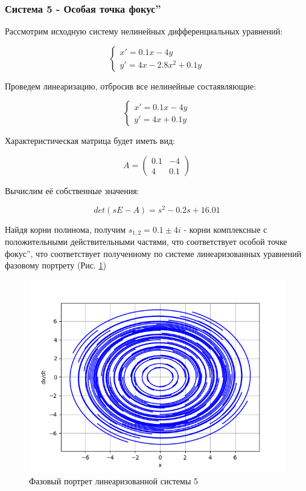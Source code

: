 \subsubsection{Система 5 - Особая точка  фокус\textquotedblright}

Рассмотрим исходную систему нелинейных дифференциальных уравнений:

$$
\begin{cases}
x' = 0.1x - 4y \\
y' = 4x - 2.8x^2 + 0.1y
\end{cases}
$$

Проведем линеаризацию, отбросив все нелинейные состаявляющие:

$$
\begin{cases}
	x' = 0.1x - 4y \\
	y' = 4x + 0.1y
\end{cases}
$$

Характеристическая матрица будет иметь вид:

$$
A = 
\begin{pmatrix}
	0.1 & -4 \\
	4 & 0.1
\end{pmatrix}
$$

Вычислим её собственные значения:

$$
det(sE - A) = s^2 - 0.2s + 16.01
$$

Найдя корни полинома, получим $s_{1,2} = 0.1 \pm 4i$ - корни комплексные с положительными действительными частями, 
что соответствует особой точке  фокус\textquotedblright, 
что соответствует полученному по системе линеаризованных уравнений фазовому портрету (Рис. \ref{fig:9})

\begin{figure}[H]
	\centering
	\includegraphics[width=0.6\linewidth]{body/images/Linearized-system-5.png}
	\caption{Фазовый портрет линеаризованной системы 5}
	\label{fig:9}
\end{figure}

